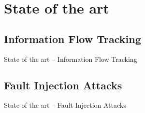 \section{State of the art}

\subsection{Information Flow Tracking}
\begin{frame}{State of the art -- Information Flow Tracking}
    
\end{frame}

\subsection{Fault Injection Attacks}
\begin{frame}{State of the art -- Fault Injection Attacks}
    
\end{frame}
